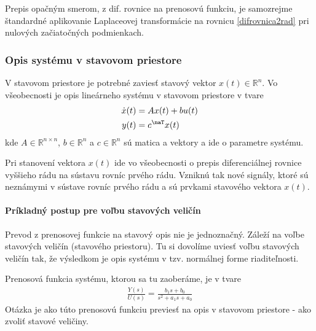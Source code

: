 \documentclass[a4paper, 10pt, ]{article}
\begin{document}
Prepis opačným smerom, z dif. rovnice na prenosovú funkciu, je samozrejme štandardné aplikovanie Laplaceovej transformácie na rovnicu \eqref{difrovnica2rad} pri nulových začiatočných podmienkach.







\subsubsection{Opis systému v stavovom priestore}

V stavovom priestore je potrebné zaviesť stavový vektor $x(t) \in \mathbb R^n$. Vo všeobecnosti je opis lineárneho systému v stavovom priestore v tvare
\begin{subequations}
\begin{align}
    \dot x(t) &= A x(t) + b u(t) \\
    y(t) &= c^\naT x(t) 
\end{align}
\end{subequations}
kde $A \in \mathbb R^{n \times n}$, $b \in \mathbb R^n$ a $c \in \mathbb R^n$ sú matica a vektory a ide o parametre systému.

Pri stanovení vektora $x(t)$ ide vo všeobecnosti o prepis diferenciálnej rovnice vyššieho rádu na sústavu rovníc prvého rádu. Vzniknú tak nové signály, ktoré sú neznámymi v sústave rovníc prvého rádu a sú prvkami stavového vektora $x(t)$.



\paragraph{Príkladný postup pre voľbu stavových veličín}

Prevod z prenosovej funkcie na stavový opis nie je jednoznačný. Záleží na voľbe stavových veličín (stavového priestoru). Tu si dovolíme uviesť voľbu stavových veličín tak, že výsledkom je opis systému v tzv. normálnej forme riaditeľnosti.

Prenosová funkcia systému, ktorou sa tu zaoberáme, je v tvare
\begin{align} \label{tfVseob01}
	\frac{Y(s)}{U(s)} = \frac{b_1 s + b_0}{ s^2 + a_1 s + a_0}
\end{align}
Otázka je ako túto prenosovú funkciu previesť na opis v stavovom priestore - ako zvoliť stavové veličiny.
\end{document}
